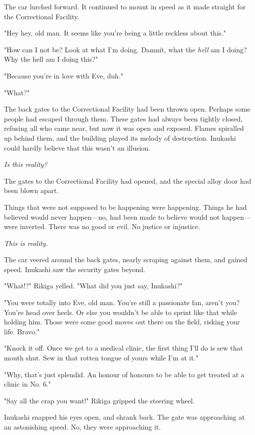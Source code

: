 The car lurched forward. It continued to mount in speed as it made
straight for the Correctional Facility.

"Hey hey, old man. It seems like you're being a little reckless about
this."

"How can I not be? Look at what I'm doing. Damnit, what the \emph{hell} am I
doing? Why the hell am I doing this?"

"Because you're in love with Eve, duh."

"What?"

The back gates to the Correctional Facility had been thrown open.
Perhaps some people had escaped through them. These gates had always
been tightly closed, refusing all who came near, but now it was open and
exposed. Flames spiralled up behind them, and the building played its
melody of destruction. Inukashi could hardly believe that this wasn't an
illusion.

\emph{Is this reality?}

The gates to the Correctional Facility had opened, and the special alloy
door had been blown apart.

Things that were not supposed to be happening were happening. Things he
had believed would never happen---no, had been made to believe would not
happen---were inverted. There was no good or evil. No justice or
injustice.

\emph{This is reality.}

The car veered around the back gates, nearly scraping against them, and
gained speed. Inukashi saw the security gates beyond.

"What!?" Rikiga yelled. "What did you just say, Inukashi?"

"You were totally into Eve, old man. You're still a passionate fan,
aren't you? You're head over heels. Or else you wouldn't be able to
sprint like that while holding him. Those were some good moves out there
on the field, risking your life. Bravo."

"Knock it off. Once we get to a medical clinic, the first thing I'll do
is sew that mouth shut. Sew in that rotten tongue of yours while I'm at
it."

"Why, that's just splendid. An honour of honours to be able to get
treated at a clinic in No. 6."

"Say all the crap you want!" Rikiga gripped the steering wheel.

Inukashi snapped his eyes open, and shrank back. The gate was
approaching at an astonishing speed. No, they were approaching it.

